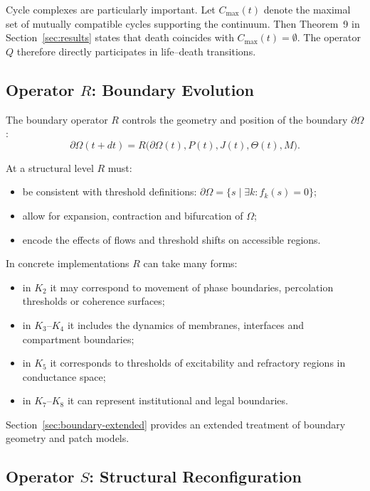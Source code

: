 Cycle complexes are particularly important. Let \(C_{\max}(t)\) denote the
maximal set of mutually compatible cycles supporting the continuum. Then
Theorem~9 in Section~\ref{sec:results} states that death coincides with
\(C_{\max}(t) = \emptyset\). The operator \(Q\) therefore directly participates
in life–death transitions.

\subsection{Operator \texorpdfstring{\texorpdfstring{$R$}{R}}{R}: Boundary Evolution}

The boundary operator \(R\) controls the geometry and position of the boundary
\(\partial\Omega\):
\[
  \partial\Omega(t+dt) =
    R\big(\partial\Omega(t), P(t), J(t), \Theta(t), M\big).
\]

At a structural level \(R\) must:
\begin{itemize}
  \item be consistent with threshold definitions:
        \(\partial\Omega = \{ s \mid \exists k: f_k(s) = 0 \}\);
  \item allow for expansion, contraction and bifurcation of \(\Omega\);
  \item encode the effects of flows and threshold shifts on accessible regions.
\end{itemize}

In concrete implementations \(R\) can take many forms:
\begin{itemize}
  \item in \(K_2\) it may correspond to movement of phase boundaries,
        percolation thresholds or coherence surfaces;
  \item in \(K_3\)–\(K_4\) it includes the dynamics of membranes, interfaces
        and compartment boundaries;
  \item in \(K_5\) it corresponds to thresholds of excitability and refractory
        regions in conductance space;
  \item in \(K_7\)–\(K_8\) it can represent institutional and legal
        boundaries.
\end{itemize}

Section~\ref{sec:boundary-extended} provides an extended treatment of boundary
geometry and patch models.

\subsection{Operator \texorpdfstring{\texorpdfstring{$S$}{S}}{S}: Structural Reconfiguration}

